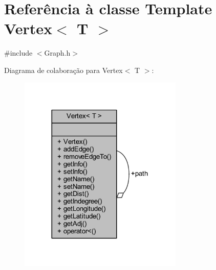 \hypertarget{class_vertex}{}\section{Referência à classe Template Vertex$<$ T $>$}
\label{class_vertex}


{\ttfamily \#include $<$Graph.\+h$>$}



Diagrama de colaboração para Vertex$<$ T $>$\+:
\nopagebreak
\begin{figure}[H]
\begin{center}
\leavevmode
\includegraphics[width=221pt]{class_vertex__coll__graph}
\end{center}
\end{figure}
